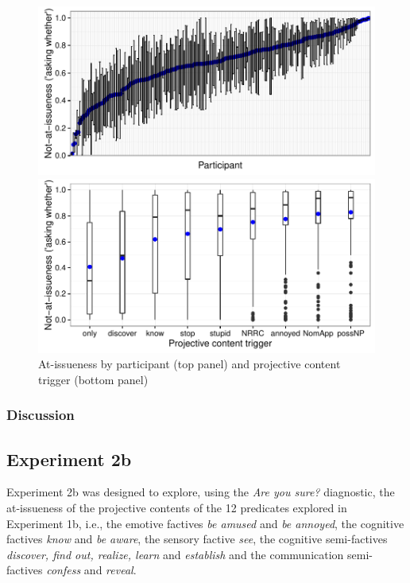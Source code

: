 \documentclass[11pt,fleqn]{article}
\newcommand{\6}{\mbox{$[\hspace*{-.6mm}[$}}
\newcommand{\9}{\mbox{$]\hspace*{-.6mm}]$}}
\begin{document}
\begin{figure}[!h]
\begin{center}

\includegraphics[width=12cm]{../results/exp2a/graphs/ai-subjectmeans}

\includegraphics[width=12cm]{../results/exp2a/graphs/boxplot-not-at-issueness}

\end{center}
\caption{At-issueness by participant (top panel) and projective content trigger (bottom panel)}
\label{f-ai-2a}
\end{figure}



\subsubsection{Discussion}

\subsection{Experiment 2b} 

Experiment 2b was designed to explore, using the {\em Are you sure?} diagnostic, the at-issueness of the projective contents of the 12 predicates explored in Experiment 1b, i.e., the emotive factives {\em be amused} and {\em be annoyed}, the cognitive factives {\em know} and {\em be aware}, the sensory factive {\em see}, the cognitive semi-factives {\em discover, find out, realize, learn} and {\em establish} and the communication semi-factives {\em confess} and {\em reveal}.
\end{document}
